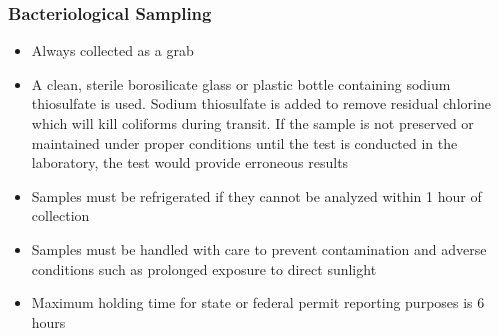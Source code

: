 \subsubsection{Bacteriological Sampling}
\begin{itemize}
\item Always collected as a grab
\item A clean, sterile borosilicate glass or plastic bottle containing sodium thiosulfate is used. Sodium thiosulfate is added to remove residual chlorine which will kill coliforms during transit. If the sample is not preserved or maintained under proper conditions until the test is conducted in the laboratory, the test would provide erroneous results
\item Samples must be refrigerated if they cannot be analyzed within 1 hour of collection
\item Samples must be handled with care to prevent contamination and adverse conditions such as prolonged exposure to direct sunlight
\item Maximum holding time for state or federal permit reporting purposes is 6 hours
\end{itemize} 

